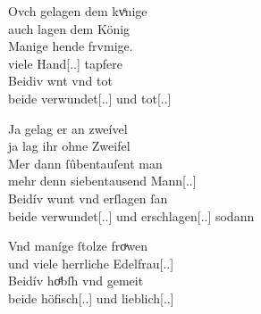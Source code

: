 \begin{exe}
\begin{xlist}
	\ex \label{ex:konjadjvvbeidiu_4} %
		\gll Ovch gelagen dem kvͤnige \\
			auch lagen dem König \\
	\sn \gll Manige hende frvmige. \\
			viele Hand[\Nom.\Pl.\F\subM] tapfere \\
	\sn \gll Beidiv wnt vnd tot \\
			beide verwundet[\Nom.\Pl.\F\subM] und
			tot[\Nom.\Pl.\F\subM] \\
		\begin{taggedline}{\parencites[\pno~150ra,20--22]{kc:VB}[vgl.][15880--15882]{schroeder1895}}
		\trans {}
		\end{taggedline}

	\ex \label{ex:konjadjvvbeidiu_5} %
		\gll Ja gelag er an zweível \\
			ja lag ihr ohne Zweifel \\
	\sn \gll Mer dann ſûbentauſent man \\
			mehr denn siebentausend Mann[\Nom.\Pl.\MascM] \\
	\sn \gll Beidív wunt vnd erſlagen ſan \\
			beide verwundet[\Nom.\Pl.\MascM] und
			erschlagen[\Nom.\Pl.\MascM] sodann \\
		\begin{taggedline}{\parencites[\pno~45va,46--48]{kc:B1}[vgl.][16891--16893]{schroeder1895}}
		\trans {}
		\end{taggedline}

	\ex \label{ex:konjadjvvbeidiu_6} %
		\gll Vnd maníge ſtolze froͮwen \\
			und viele herrliche Edelfrau[\Nom.\Pl.\FemF] \\
	\sn \gll Beidív hoͤbſh vnd gemeit \\
			beide höfisch[\Nom.\Pl.\FemF] und lieblich[\Nom.\Pl.\FemF] \\
		\begin{taggedline}{\parencites[\pno~21va,21--22]{kc:VB}[zu][4351--4352]{schroeder1895}}
		\trans {}
		\end{taggedline}
	\end{xlist}
\end{exe}

